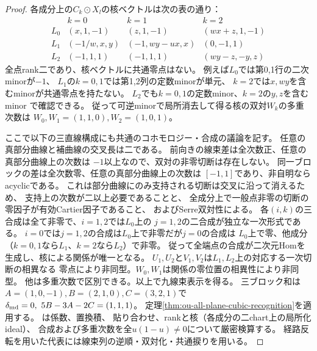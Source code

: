 \begin{proof}
各成分上の$C_k\odot X_l$の核ベクトルは次の表の通り：
\[
\begin{array}{c|ccc}
&k=0&k=1&k=2\\\hline
L_0&(x,1,-1)&(z,1,-1)&(wx+z,1,-1)\\
L_1&(-1/w,x,y)&(-1,wy-ux,x)&(0,-1,1)\\
L_2&(-1,1,1)&(-1,1,1)&(wy-z,-y,z)
\end{array}
\]
全点rank二であり、核ベクトルに共通零点はない。
例えば$L_0$では第0,1行の二次minorが$-1$、
$L_1$の$k=0,1$では第1,2列の定数minorが単元、
$k=2$では$x,wy$を含むminorが共通零点を持たない。
$L_2$でも$k=0,1$の定数minor、$k=2$の$y,z$を含むminor
で確認できる。
従って可逆minorで局所消去して得る核の双対$W_k$の多重次数は
$W_0,W_1=(1,1,0),W_2=(1,0,1)$。

ここで以下の三直線構成にも共通のコホモロジー・合成の議論を記す。
任意の真部分曲線と補曲線の交叉長は二である。
前向きの線束差は全次数正、任意の真部分曲線上の次数は
$-1$以上なので、双対の非零切断は存在しない。
同一ブロックの差は全次数零、任意の真部分曲線上の次数は
$[-1,1]$であり、非自明ならacyclicである。
これは部分曲線にのみ支持される切断は交叉に沿って消えるため、
支持上の次数が二以上必要であることと、
全成分上で一般点非零の切断の零因子が有効Cartier因子であること、
およびSerre双対性による。
各$(i,k)$の三合成は全て非零で、$i=1,2$では$L_0$上の
$j=1,2$の二合成が独立な一次形式である。
$i=0$では$j=1,2$の合成は$L_0$上で非零だが$j=0$の合成は
$L_0$上で零、他成分（$k=0,1$なら$L_1$、$k=2$なら$L_2$）で非零。
従って全端点の合成が二次元Homを生成し、核による関係が唯一となる。
$U_1,U_2$と$V_1,V_2$は$L_1,L_2$上の対応する一次切断の相異なる
零点により非同型。$W_0,W_1$は関係の零位置の相異性により非同型。
他は多重次数で区別できる。以上で九線束表示を得る。
三ブロック和は$A=(1,0,-1),B=(2,1,0),C=(3,2,1)$で
$\delta_{\rm md}=0,\ 5B-3A-2C=(1,1,1)$。
定理\ref{thm:ou-all-plane-cubic-recognition}を適用する。
は係数、置換積、
貼り合わせ、rankと核（各成分の二chart上の局所化ideal）、
合成および多重次数を全$u(1-u)\ne0$について厳密検算する。
経路反転を用いた代表には線束列の逆順・双対化・共通捩りを用いる。
\end{proof}

